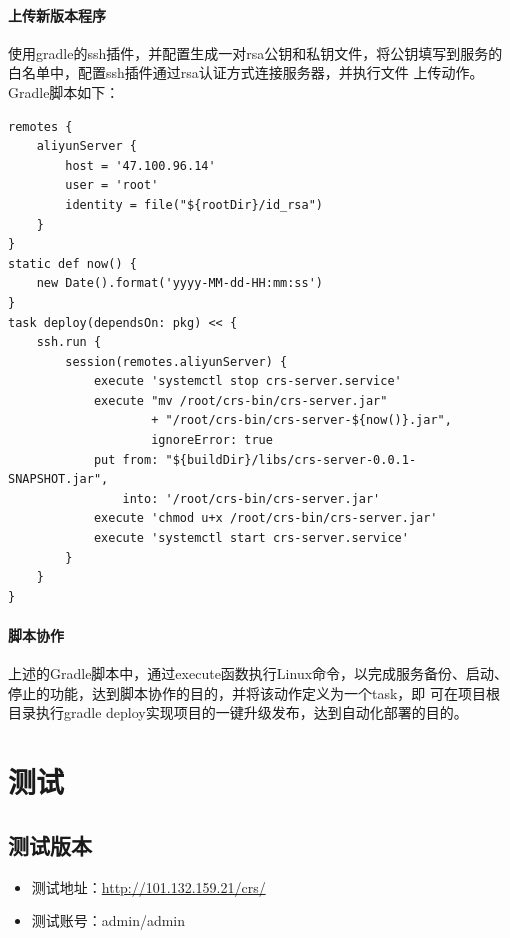 \documentclass[titlepage,UTF8,linespread=1.5]{ctexart}
\begin{document}
\paragraph{上传新版本程序}
使用gradle的ssh插件，并配置生成一对rsa公钥和私钥文件，将公钥填写到服务的白名单中，配置ssh插件通过rsa认证方式连接服务器，并执行文件
上传动作。Gradle脚本如下：
\begin{mdframed}\begin{verbatim}
remotes {
    aliyunServer {
        host = '47.100.96.14'
        user = 'root'
        identity = file("${rootDir}/id_rsa")
    }
}
static def now() {
    new Date().format('yyyy-MM-dd-HH:mm:ss')
}
task deploy(dependsOn: pkg) << {
    ssh.run {
        session(remotes.aliyunServer) {
            execute 'systemctl stop crs-server.service'
            execute "mv /root/crs-bin/crs-server.jar" 
                    + "/root/crs-bin/crs-server-${now()}.jar", 
                    ignoreError: true
            put from: "${buildDir}/libs/crs-server-0.0.1-SNAPSHOT.jar", 
                into: '/root/crs-bin/crs-server.jar'
            execute 'chmod u+x /root/crs-bin/crs-server.jar'
            execute 'systemctl start crs-server.service'
        }
    }
}
\end{verbatim}\end{mdframed}\par
\paragraph{脚本协作}
上述的Gradle脚本中，通过execute函数执行Linux命令，以完成服务备份、启动、停止的功能，达到脚本协作的目的，并将该动作定义为一个task，即
可在项目根目录执行gradle deploy实现项目的一键升级发布，达到自动化部署的目的。

\clearpage

\section{测试}
\subsection{测试版本}
\begin{itemize}
    \item 测试地址：\url{http://101.132.159.21/crs/}
    \item 测试账号：admin/admin
\end{itemize}
\end{document}
